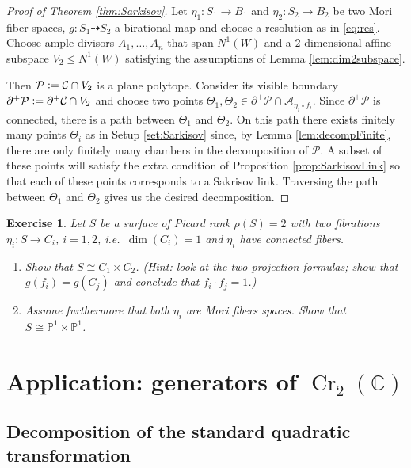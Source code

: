 \documentclass[a4paper,11pt]{amsart}
\newtheorem{exercise}[theorem]{Exercise}
\def\dim{\operatorname{dim}}
\def\Cr{\operatorname{Cr}}
\newcommand{\Cc}{\mathcal{C}}
\newcommand{\Aa}{\mathcal{A}}
\newcommand{\Pp}{\mathcal{P}}
\newcommand{\CC}{\mathbb{C}}
\newcommand{\PP}{\mathbb{P}}
\newcommand{\isom}{\cong}
\newcommand{\defeq}{\vcentcolon=}
\newcommand{\rmap}{\dashrightarrow}
\begin{document}
\begin{proof}[{Proof of Theorem \ref{thm:Sarkisov}}]
	Let $\eta_1\colon S_1 \to B_1$  and $\eta_2\colon S_2 \to B_2$ be two Mori fiber spaces, $g \colon S_1 \rmap S_2$ a birational map and choose a resolution as in \eqref{eq:res}.
	Choose ample divisors $A_1,\dots,A_n$ that span $N^1(W)$ and a $2$-dimensional affine subspace $V_2 \leq N^1(W)$ satisfying the assumptions of Lemma \ref{lem:dim2subspace}.
	
	Then $\Pp \defeq \Cc \cap V_2$ is a plane polytope.
	Consider its visible boundary $\partial^+\Pp \defeq \partial^+\Cc \cap V_2$ and choose two points $\Theta_1, \Theta_2 \in \partial^+\Pp \cap \Aa_{\eta_i \circ f_i}$.
	Since $\partial^+\Pp$ is connected, there is a path between $\Theta_1$ and $\Theta_2$.
	On this path there exists finitely many points $\Theta_i$ as in Setup \ref{set:Sarkisov} since, by Lemma \ref{lem:decompFinite}, there are only finitely many chambers in the decomposition of $\Pp$.
	A subset of these points will satisfy the extra condition of Proposition \ref{prop:SarkisovLink} so that each of these points corresponds to a Sakrisov link.
	Traversing the path between $\Theta_1$ and $\Theta_2$ gives us the desired decomposition.
\end{proof}


\begin{exercise}\label{exer:P1P12fibrations}
	Let $S$ be a surface of Picard rank $\rho(S)= 2$ with two fibrations $\eta_i\colon S\to C_i$, $i=1,2$, i.e.\ $\dim(C_i) = 1$ and $\eta_i$ have connected fibers.
	\begin{enumerate}
		\item Show that $S \isom C_1 \times C_2$. {\small (Hint: look at the two projection formulas; show that $g(f_i) = g(C_j)$ and conclude that $f_i\cdot f_j = 1$.)}
		\item Assume furthermore that both $\eta_i$ are Mori fibers spaces.
		Show that $S \isom \PP^1 \times \PP^1$.
	\end{enumerate}
\end{exercise}


\section{Application: generators of $\Cr_2(\CC)$}


\subsection{Decomposition of the standard quadratic transformation}
\end{document}
